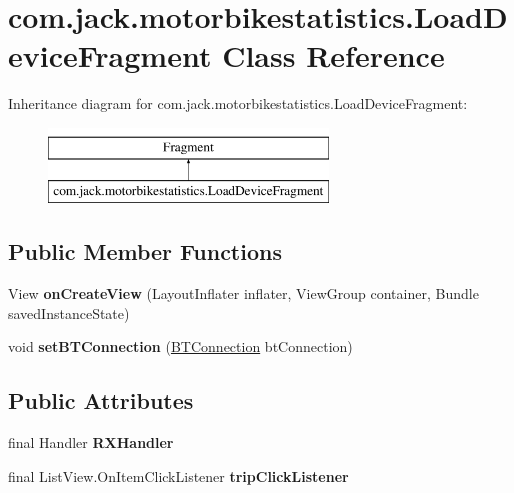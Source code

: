 \hypertarget{classcom_1_1jack_1_1motorbikestatistics_1_1_load_device_fragment}{}\section{com.\+jack.\+motorbikestatistics.\+Load\+Device\+Fragment Class Reference}
\label{classcom_1_1jack_1_1motorbikestatistics_1_1_load_device_fragment}
Inheritance diagram for com.\+jack.\+motorbikestatistics.\+Load\+Device\+Fragment\+:\begin{figure}[H]
\begin{center}
\leavevmode
\includegraphics[height=2.000000cm]{classcom_1_1jack_1_1motorbikestatistics_1_1_load_device_fragment}
\end{center}
\end{figure}
\subsection*{Public Member Functions}
\begin{DoxyCompactItemize}
\item 
\mbox{\label{classcom_1_1jack_1_1motorbikestatistics_1_1_load_device_fragment_a9ad9f0d9ef69417e2131613009c02338}} 
View {\bfseries on\+Create\+View} (Layout\+Inflater inflater, View\+Group container, Bundle saved\+Instance\+State)
\item 
\mbox{\label{classcom_1_1jack_1_1motorbikestatistics_1_1_load_device_fragment_aec66dc5fd944098de78ace4175fca5b6}} 
void {\bfseries set\+B\+T\+Connection} (\hyperlink{classcom_1_1jack_1_1motorbikestatistics_1_1_b_t_connection}{B\+T\+Connection} bt\+Connection)
\end{DoxyCompactItemize}
\subsection*{Public Attributes}
\begin{DoxyCompactItemize}
\item 
final Handler {\bfseries R\+X\+Handler}
\item 
final List\+View.\+On\+Item\+Click\+Listener {\bfseries trip\+Click\+Listener}
\end{DoxyCompactItemize}



